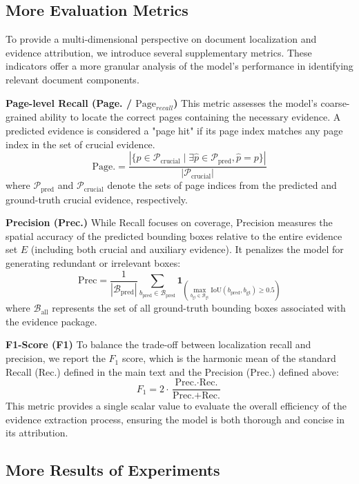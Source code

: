\documentclass[]{opendatalab}
\begin{document}
{{{\subsection{More Evaluation Metrics}
\label{Appendix: More Evaluation Metrics}
To provide a multi-dimensional perspective on document localization and evidence attribution, we introduce several supplementary metrics. These indicators offer a more granular analysis of the model's performance in identifying relevant document components.

\textbf{Page-level Recall (Page. / $\text{Page}_{recall}$)} This metric assesses the model's coarse-grained ability to locate the correct pages containing the necessary evidence. A predicted evidence is considered a "page hit" if its page index matches any page index in the set of crucial evidence.
\[
\text{Page.} = \frac{|\{p \in \mathcal{P}_{\text{crucial}} \mid \exists \hat{p} \in \mathcal{P}_{\text{pred}}, \hat{p} = p\}|}{|\mathcal{P}_{\text{crucial}}|}
\]
where $\mathcal{P}_{\text{pred}}$ and $\mathcal{P}_{\text{crucial}}$ denote the sets of page indices from the predicted and ground-truth crucial evidence, respectively.

\textbf{Precision (Prec.)} While Recall focuses on coverage, Precision measures the spatial accuracy of the predicted bounding boxes relative to the entire evidence set $E$ (including both crucial and auxiliary evidence). It penalizes the model for generating redundant or irrelevant boxes:
\[
\text{Prec} = \frac{1}{|\mathcal{B}_{\text{pred}}|} \sum_{b_{\text{pred}} \in \mathcal{B}_{\text{pred}}} \mathbf{1}_{\left( \max_{b_{\text{gt}} \in \mathcal{B}_{\text{gt}}} \text{IoU}(b_{\text{pred}}, b_{\text{gt}}) \ge 0.5 \right)}
\]
where $\mathcal{B}_{\text{all}}$ represents the set of all ground-truth bounding boxes associated with the evidence package.

\textbf{F1-Score (F1)} To balance the trade-off between localization recall and precision, we report the $F_1$ score, which is the harmonic mean of the standard Recall ($\text{Rec.}$) defined in the main text and the Precision ($\text{Prec.}$) defined above:
\[
F_1 = 2 \cdot \frac{\text{Prec.} \cdot \text{Rec.}}{\text{Prec.} + \text{Rec.}}
\]
This metric provides a single scalar value to evaluate the overall efficiency of the evidence extraction process, ensuring the model is both thorough and concise in its attribution.

\subsection{More Results of Experiments}
\label{Appendix: More Results of Experiments}
}}}
\end{document}
